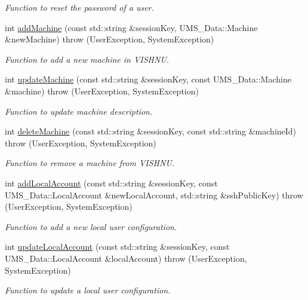 \begin{DoxyCompactItemize}
\begin{DoxyCompactList}\small\item\em Function to reset the password of a user. \item\end{DoxyCompactList}\item 
int \hyperlink{namespacevishnu_aca4f5c2716ce1dd8ddc15a2554c95004}{addMachine} (const std::string \&sessionKey, UMS\_\-Data::Machine \&newMachine)  throw (UserException, SystemException)
\begin{DoxyCompactList}\small\item\em Function to add a new machine in VISHNU. \item\end{DoxyCompactList}\item 
int \hyperlink{namespacevishnu_a1f8fe4e8fa5956be1f264e9a5f78c9f1}{updateMachine} (const std::string \&sessionKey, const UMS\_\-Data::Machine \&machine)  throw (UserException, SystemException)
\begin{DoxyCompactList}\small\item\em Function to update machine description. \item\end{DoxyCompactList}\item 
int \hyperlink{namespacevishnu_abdd14f47db308fc03655149ac7d93199}{deleteMachine} (const std::string \&sessionKey, const std::string \&machineId)  throw (UserException, SystemException)
\begin{DoxyCompactList}\small\item\em Function to remove a machine from VISHNU. \item\end{DoxyCompactList}\item 
int \hyperlink{namespacevishnu_ab54431ee8c1616ae24b071e9146d39e9}{addLocalAccount} (const std::string \&sessionKey, const UMS\_\-Data::LocalAccount \&newLocalAccount, std::string \&sshPublicKey)  throw (UserException, SystemException)
\begin{DoxyCompactList}\small\item\em Function to add a new local user configuration. \item\end{DoxyCompactList}\item 
int \hyperlink{namespacevishnu_ac51341ab58c1ed606b254262fbc053dc}{updateLocalAccount} (const std::string \&sessionKey, const UMS\_\-Data::LocalAccount \&localAccount)  throw (UserException, SystemException)
\begin{DoxyCompactList}\small\item\em Function to update a local user configuration. \item\end{DoxyCompactList}\item 

\end{DoxyCompactItemize}
